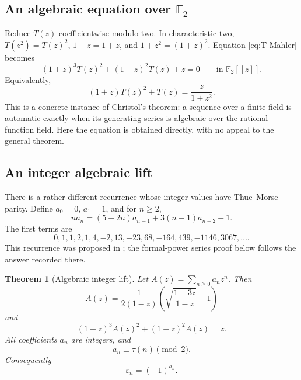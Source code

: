 \documentclass[11pt,oneside]{article}
\newtheorem{theorem}{Theorem}[section]
\theoremstyle{definition}
\theoremstyle{remark}
\newcommand{\Ftwo}{\mathbb F_2}
\newcommand{\eps}{\varepsilon}
\begin{document}
\subsection{An algebraic equation over \(\mathbb F_2\)}
\label{sec:F2-algebraic}

Reduce \(T(z)\) coefficientwise modulo two.  In characteristic two,
\(T(z^2)=T(z)^2\), \(1-z=1+z\), and
\(1+z^2=(1+z)^2\).  Equation \eqref{eq:T-Mahler} becomes
\begin{equation}
  (1+z)^3T(z)^2+(1+z)^2T(z)+z=0
  \qquad\text{in }\Ftwo[[z]].
  \label{eq:T-algebraic-F2}
\end{equation}
Equivalently,
\begin{equation}
  (1+z)T(z)^2+T(z)=\frac{z}{1+z^2}.
  \label{eq:T-algebraic-F2-short}
\end{equation}
This is a concrete instance of Christol's theorem: a sequence over a finite
field is automatic exactly when its generating series is algebraic over the
rational-function field.  Here the equation is obtained directly, with no
appeal to the general theorem.

\subsection{An integer algebraic lift}
\label{sec:integer-lift}

There is a rather different recurrence whose integer values have
Thue--Morse parity.  Define \(a_0=0\), \(a_1=1\), and for \(n\ge2\),
\begin{equation}
  n a_n=(5-2n)a_{n-1}+3(n-1)a_{n-2}+1.
  \label{eq:integer-lift-recurrence}
\end{equation}
The first terms are
\[
  0,1,1,2,1,4,-2,13,-23,68,-164,439,-1146,3067,\ldots .
\]
This recurrence was proposed in \cite{reshetnikovRecurrence}; the formal-power
series proof below follows the answer recorded there.

\begin{theorem}[Algebraic integer lift]
Let \(A(z)=\sum_{n\ge0}a_nz^n\).  Then
\begin{equation}
  A(z)=\frac{1}{2(1-z)}
  \left(\sqrt{\frac{1+3z}{1-z}}-1\right)
  \label{eq:A-closed-form}
\end{equation}
and
\begin{equation}
  (1-z)^3A(z)^2+(1-z)^2A(z)=z.
  \label{eq:A-algebraic}
\end{equation}
All coefficients \(a_n\) are integers, and
\begin{equation}
  \boxed{a_n\equiv\tau(n)\pmod2.}
  \label{eq:A-parity}
\end{equation}
Consequently
\begin{equation}
  \eps_n=(-1)^{a_n}.
  \label{eq:A-sign-formula}
\end{equation}
\end{theorem}
\end{document}
